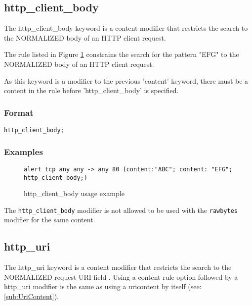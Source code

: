 \documentclass[english]{report}
\newenvironment{note}{
\samepage
    \vspace{10pt}{\textsf{
        {\hspace{7pt}\Huge{$\triangle$\hspace{-12.5pt}{\Large{$^!$}}}}\hspace{5pt}
        {\Large{NOTE}}
    }
    }
   \begin{center}
    \par\vspace{-17pt}

    \begin{lrbox}{\savepar}
    \begin{minipage}[r]{6in}
}
{
    \end{minipage}
    \end{lrbox}
    \fbox{
        \usebox{
            \savepar
	}
    }
    \par\vskip10pt
    \end{center}
}
\newenvironment{note}{
        \begin{rawhtml}
        <p><table border="1"><tr><td><b>
        Note:&nbsp;&nbsp;</b>
        \end{rawhtml}
}{
        \begin{rawhtml}
        </b></td></tr></table></p>
        \end{rawhtml}
}
\begin{document}
\subsection{http\_client\_body\label{sub:HttpClientBody}}

The http\_client\_body keyword is a content modifier that restricts
the search to the NORMALIZED body of an HTTP client request.

The rule listed in Figure \ref{fig:HttpClientBody} constrains the
search for the pattern "EFG" to the NORMALIZED body of an HTTP client request.

As this keyword is a modifier to the previous 'content' keyword, there must be
a content in the rule before 'http\_client\_body' is specified.

\subsubsection{Format}

\begin{verbatim}
http_client_body;
\end{verbatim}

\subsubsection{Examples}

\begin{figure}[!hbpt]
\begin{verbatim}
alert tcp any any -> any 80 (content:"ABC"; content: "EFG"; http_client_body;)
\end{verbatim}
\caption{http\_client\_body usage example \label{fig:HttpClientBody}}
\end{figure}

\begin{note}
The \texttt{http\_client\_body} modifier is not allowed to be used with
the \texttt{rawbytes} modifier for the same content.
\end{note}


\subsection{http\_uri\label{sub:HttpUri}}

The http\_uri keyword is a content modifier that restricts
the search to the NORMALIZED request \textsc{URI} field .  Using a
content rule option followed by a http\_uri modifier is the
same as using a uricontent by itself (see: \ref{sub:UriContent}).
\end{document}
